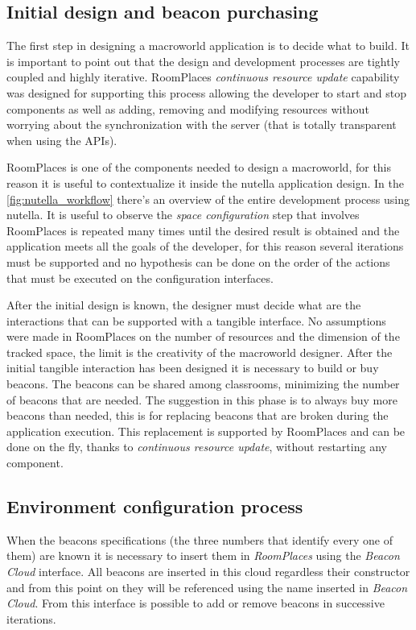 \subsection{Initial design and beacon purchasing}
The first step in designing a macroworld application is to decide what to build. It is important to point out that the design and development processes are tightly coupled and highly iterative. RoomPlaces \textit{continuous resource update} capability was designed for supporting this process allowing the developer to start and stop components as well as adding, removing and modifying resources without worrying about the synchronization with the server (that is totally transparent when using the APIs).

RoomPlaces is one of the components needed to design a macroworld, for this reason it is useful to contextualize it inside the nutella application design. In the \ref{fig:nutella_workflow} there's an overview of the entire development process using nutella. It is useful to observe the \textit{space configuration} step that involves RoomPlaces is repeated many times until the desired result is obtained and the application meets all the goals of the developer, for this reason several iterations must be supported and no hypothesis can be done on the order of the actions that must be executed on the configuration interfaces.

After the initial design is known, the designer must decide what are the interactions that can be supported with a tangible interface. No assumptions were made in RoomPlaces on the number of resources and the dimension of the tracked space, the limit is the creativity of the macroworld designer. After the initial tangible interaction has been designed it is necessary to build or buy beacons. The beacons can be shared among classrooms, minimizing the number of beacons that are needed. The suggestion in this phase is to always buy more beacons than needed, this is for replacing beacons that are broken during the application execution. This replacement is supported by RoomPlaces and can be done on the fly, thanks to \textit{continuous resource update}, without restarting any component.

\subsection{Environment configuration process}
When the beacons specifications (the three numbers that identify every one of them) are known it is necessary to insert them in \textit{RoomPlaces} using the \textit{Beacon Cloud} interface. All beacons are inserted in this cloud regardless their constructor and from this point on they will be referenced using the name inserted in \textit{Beacon Cloud}. From this interface is possible to add or remove beacons in successive iterations.

